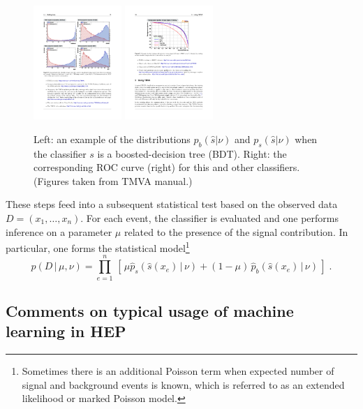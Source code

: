 \documentclass[12pt]{article}
\numberwithin{equation}{section}
\theoremstyle{plain}
\begin{document}
\begin{figure}[htbp]
\begin{center}
 \includegraphics[height=1.7in]{figures/example-TMVA-BDT.pdf}
 \includegraphics[height=1.7in]{figures/example-TMVA-ROC.pdf}
\caption{Left: an example of the distributions $p_b(\hat s|\nu)$ and $p_s(\hat s|\nu)$ when the classifier $s$ is a boosted-decision tree (BDT). Right: the corresponding ROC curve (right) for this and other classifiers. (Figures taken from TMVA manual.)}
\label{fig:tmva}
\end{center}
\end{figure}

These steps feed into a subsequent statistical test based on the observed data
${D=(x_1, \dots, x_n)}$. For each event, the classifier is evaluated and one
performs inference on a parameter $\mu$ related to the presence of the signal
contribution. In particular, one forms the statistical model\footnote{Sometimes
there is an additional Poisson term when expected number of signal and
background events is known, which is referred to as an extended likelihood or
marked Poisson model.}
\begin{equation}\label{eq:typicalML}
p( D \,|\, \mu, \nu) = \prod_{e=1}^n \, \left[\, \mu \hat{p}_s( \hat s(x_e) \, |\,  \nu)  + (1-\mu)\, \hat{p}_b( \hat s(x_e) \,|\, \nu) \,\right] \; .
\end{equation}

\subsection{Comments on typical usage of machine learning in HEP}
\end{document}
